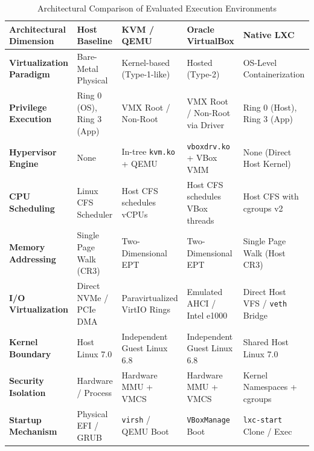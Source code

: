 \begin{table}[t]
\centering
\small
\caption{Architectural Comparison of Evaluated Execution Environments}
\begin{tabularx}{\textwidth}{>{\raggedright\arraybackslash}p{3.2cm}>{\raggedright\arraybackslash}X>{\raggedright\arraybackslash}X>{\raggedright\arraybackslash}X>{\raggedright\arraybackslash}X}
\toprule
\textbf{Architectural Dimension} & \textbf{Host Baseline} & \textbf{KVM / QEMU} & \textbf{Oracle VirtualBox} & \textbf{Native LXC} \\
\midrule
\textbf{Virtualization Paradigm} & Bare-Metal Physical & Kernel-based (Type-1-like) & Hosted (Type-2) & OS-Level Containerization \\
\textbf{Privilege Execution} & Ring 0 (OS), Ring 3 (App) & VMX Root / Non-Root & VMX Root / Non-Root via Driver & Ring 0 (Host), Ring 3 (App) \\
\textbf{Hypervisor Engine} & None & In-tree \texttt{kvm.ko} + QEMU & \texttt{vboxdrv.ko} + VBox VMM & None (Direct Host Kernel) \\
\textbf{CPU Scheduling} & Linux CFS Scheduler & Host CFS schedules vCPUs & Host CFS schedules VBox threads & Host CFS with cgroups v2 \\
\textbf{Memory Addressing} & Single Page Walk (CR3) & Two-Dimensional EPT & Two-Dimensional EPT & Single Page Walk (Host CR3) \\
\textbf{I/O Virtualization} & Direct NVMe / PCIe DMA & Paravirtualized VirtIO Rings & Emulated AHCI / Intel e1000 & Direct Host VFS / \texttt{veth} Bridge \\
\textbf{Kernel Boundary} & Host Linux 7.0 & Independent Guest Linux 6.8 & Independent Guest Linux 6.8 & Shared Host Linux 7.0 \\
\textbf{Security Isolation} & Hardware / Process & Hardware MMU + VMCS & Hardware MMU + VMCS & Kernel Namespaces + cgroups \\
\textbf{Startup Mechanism} & Physical EFI / GRUB & \texttt{virsh} / QEMU Boot & \texttt{VBoxManage} Boot & \texttt{lxc-start} Clone / Exec \\
\bottomrule
\end{tabularx}
\end{table}
